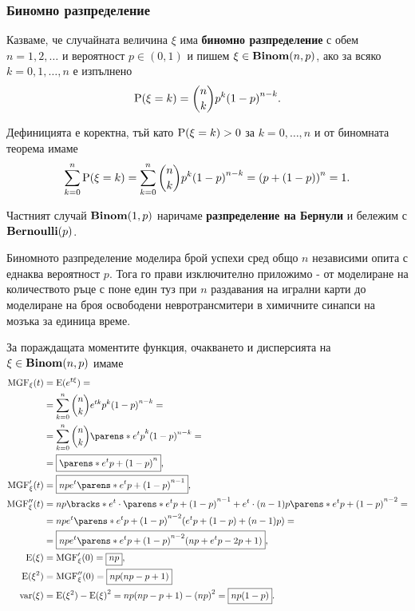 \documentclass{../../common/topic}
\begin{document}
\subsubsection{Биномно разпределение}\label{sec:binomial}

\begin{definition}
  Казваме, че случайната величина \( \xi \) има \textbf{биномно разпределение} с обем \( n = 1, 2, \ldots \) и вероятност \( p \in (0, 1) \) и пишем \( \xi \in \operatorname{\mathbf{Binom}}(n, p) \), ако за всяко \( k = 0, 1, \ldots, n \) е изпълнено
  \begin{equation*}
    \operatorname{P}(\xi = k) = \binom{n}{k} p^k {(1-p)}^{n-k}.
  \end{equation*}

  Дефиницията е коректна, тъй като \( \operatorname{P}(\xi = k) > 0 \) за \( k = 0, \ldots, n \) и от биномната теорема имаме
  \begin{equation*}
    \sum_{k=0}^n \operatorname{P}(\xi = k)
    =
    \sum_{k=0}^n \binom{n}{k} p^k {(1-p)}^{n-k}
    =
    {(p+(1-p))}^n = 1.
  \end{equation*}

  Частният случай \( \operatorname{\mathbf{Binom}}(1, p) \) наричаме \textbf{разпределение на Бернули} и бележим с \( \operatorname{\mathbf{Bernoulli}}(p) \).
\end{definition}

Биномното разпределение моделира брой успехи сред общо \( n \) независими опита с еднаква вероятност \( p \). Тога го прави изключително приложимо - от моделиране на количеството ръце с поне един туз при \( n \) раздавания на игрални карти до моделиране на броя освободени невротрансмитери в химичните синапси на мозъка за единица време.

За пораждащата моментите функция, очакването и дисперсията на \( \xi \in \operatorname{\mathbf{Binom}}(n, p) \) имаме
\begingroup
\allowdisplaybreaks
\begin{align*}
  \MGF_\xi(t)
  &=
  \Expect(e^{t\xi})
  = \\ &=
  \sum_{k=0}^n \binom{n}{k} e^{tk} p^k {(1-p)}^{n-k}
  = \\ &=
  \sum_{k=0}^n \binom{n}{k} {\parens*{ e^t p }}^k {(1-p)}^{n-k}
  = \\ &=
  \boxed{{\parens*{ e^t p + (1-p) }}^n},
  \\
  \MGF'_\xi(t)
  &=
  \boxed{n p e^t {\parens*{ e^t p + (1-p) }}^{n-1}},
  \\
  \MGF''_\xi(t)
  &=
  n p \bracks*{ e^t \cdot {\parens*{ e^t p + (1-p) }}^{n-1} + e^t \cdot (n-1) p {\parens*{ e^t p + (1-p) }}^{n-2} }
  = \\ &=
  n p e^t {\parens*{ e^t p + (1-p) }}^{n-2} (e^t p + (1-p) + (n-1)p)
  = \\ &=
  \boxed{n p e^t {\parens*{ e^t p + (1-p) }}^{n-2} (np + e^t p - 2p + 1)},
  \\
  \Expect(\xi)
  &=
  \MGF'_\xi(0)
  =
  \boxed{np},
  \\
  \Expect(\xi^2)
  &=
  \MGF''_\xi(0)
  =
  \boxed{np(np - p + 1)}
  \\
  \var(\xi)
  &=
  \Expect(\xi^2) - {\Expect(\xi)}^2
  =
  np(np - p + 1) - {(np)}^2
  =
  \boxed{np(1 - p)}.
\end{align*}
\endgroup
\end{document}
